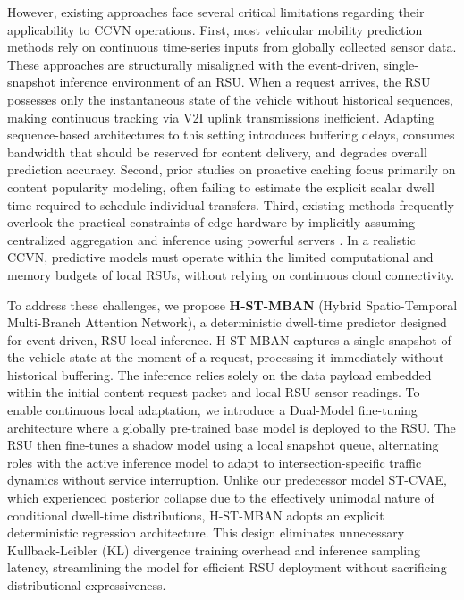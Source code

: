 \documentclass[journal]{IEEEtran}
\begin{document}
However, existing approaches face several critical limitations regarding their applicability to CCVN operations.
First, most vehicular mobility prediction methods \cite{41,43} rely on continuous time-series inputs from globally collected sensor data.
These approaches are structurally misaligned with the event-driven, single-snapshot inference environment of an RSU.
When a request arrives, the RSU possesses only the instantaneous state of the vehicle without historical sequences, making continuous tracking via V2I uplink transmissions inefficient.
Adapting sequence-based architectures to this setting introduces buffering delays, consumes bandwidth that should be reserved for content delivery, and degrades overall prediction accuracy.
Second, prior studies on proactive caching \cite{47,48,49} focus primarily on content popularity modeling, often failing to estimate the explicit scalar dwell time required to schedule individual transfers.
Third, existing methods frequently overlook the practical constraints of edge hardware by implicitly assuming centralized aggregation and inference using powerful servers \cite{61,64}.
In a realistic CCVN, predictive models must operate within the limited computational and memory budgets of local RSUs, without relying on continuous cloud connectivity.

\IEEEpubidadjcol
To address these challenges, we propose \textbf{H-ST-MBAN} (Hybrid Spatio-Temporal Multi-Branch Attention Network), a deterministic dwell-time predictor designed for event-driven, RSU-local inference.
H-ST-MBAN captures a single snapshot of the vehicle state at the moment of a request, processing it immediately without historical buffering.
The inference relies solely on the data payload embedded within the initial content request packet and local RSU sensor readings.
To enable continuous local adaptation, we introduce a Dual-Model fine-tuning architecture where a globally pre-trained base model is deployed to the RSU.
The RSU then fine-tunes a shadow model using a local snapshot queue, alternating roles with the active inference model to adapt to intersection-specific traffic dynamics without service interruption.
Unlike our predecessor model ST-CVAE, which experienced posterior collapse due to the effectively unimodal nature of conditional dwell-time distributions, H-ST-MBAN adopts an explicit deterministic regression architecture.
This design eliminates unnecessary Kullback-Leibler (KL) divergence training overhead and inference sampling latency, streamlining the model for efficient RSU deployment without sacrificing distributional expressiveness.
\end{document}
